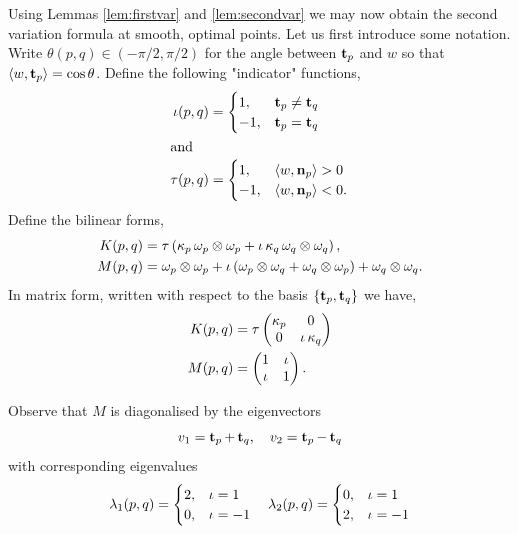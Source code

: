 \documentclass[11pt]{amsart}
\begin{document}
Using Lemmas \ref{lem:firstvar} and \ref{lem:secondvar} we may now obtain the second variation formula at smooth, optimal points. Let us first introduce some notation. Write \(\theta(p,q) \in (-\pi/2, \pi/2)\) for the angle between \(\operatorname{\mathbf{t}}_{p}\) and \(w\) so that \(\langle{w},{\operatorname{\mathbf{t}}_p}\rangle = \cos\theta\). Define the following "indicator" functions,
\begin{align*}
\operatorname{\iota}(p, q) &= \begin{cases}
1,& \operatorname{\mathbf{t}}_{p} \ne \operatorname{\mathbf{t}}_{q} \\
-1,& \operatorname{\mathbf{t}}_{p} = \operatorname{\mathbf{t}}_{q}
\end{cases} \\
\intertext{and}
\operatorname{\tau}(p, q) &= \begin{cases}
1,& \langle{w},{\operatorname{\mathbf{n}}_{p}}\rangle > 0 \\
-1,& \langle{w},{\operatorname{\mathbf{n}}_{p}}\rangle < 0.
\end{cases}
\end{align*}
Define the bilinear forms,
\begin{align*}
K(p, q) &= \operatorname{\tau} \left(\operatorname{\kappa}_p \omega_p \otimes \omega_p + \operatorname{\iota} \operatorname{\kappa}_q \omega_q \otimes \omega_q\right), \\
M(p, q) &= \omega_p \otimes \omega_p + \operatorname{\iota}\left(\omega_p \otimes \omega_q + \omega_q \otimes \omega_p\right) + \omega_q \otimes \omega_q.
\end{align*}
In matrix form, written with respect to the basis \(\{\operatorname{\mathbf{t}}_p, \operatorname{\mathbf{t}}_q\}\) we have,
\begin{align*}
K(p,q) &= \operatorname{\tau}\begin{pmatrix}
\operatorname{\kappa}_{p} & 0 \\
0 & \operatorname{\iota} \operatorname{\kappa}_{q}
\end{pmatrix} \\
M(p,q) &= \begin{pmatrix}
1 & \operatorname{\iota} \\
\operatorname{\iota} & 1
\end{pmatrix}.
\end{align*}

Observe that \(M\) is diagonalised by the eigenvectors
\begin{equation}
\label{eq:eigenvectors}
v_1 = \operatorname{\mathbf{t}}_{p} + \operatorname{\mathbf{t}}_{q}, \quad v_2 = \operatorname{\mathbf{t}}_{p} - \operatorname{\mathbf{t}}_{q}
\end{equation}
with corresponding eigenvalues
\begin{equation}
\label{eq:eigenvalues}
\lambda_1 (p, q) = \begin{cases}
2, & \operatorname{\iota} = 1 \\
0, & \operatorname{\iota} = -1
\end{cases}
\quad
\lambda_2 (p, q) = \begin{cases}
0, & \operatorname{\iota} = 1 \\
2, & \operatorname{\iota} = -1
\end{cases}
\end{equation}
\end{document}
